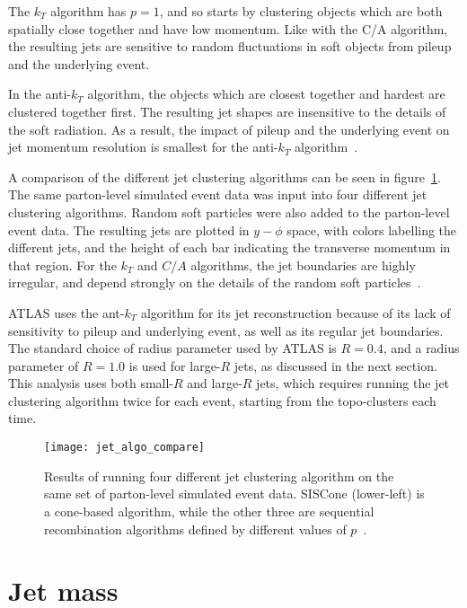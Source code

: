 The $k_T$ algorithm has $p=1$, and so starts by clustering objects which are both spatially close together and have low momentum.
Like with the C/A algorithm, the resulting jets are sensitive to random fluctuations in soft objects from pileup and the underlying event.

In the anti-$k_T$ algorithm, the objects which are closest together and hardest are clustered together first.
The resulting jet shapes are insensitive to the details of the soft radiation.
As a result, the impact of pileup and the underlying event on jet momentum resolution is smallest for the anti-$k_T$ algorithm~\cite{jet-antikt-algo}.

A comparison of the different jet clustering algorithms can be seen in figure~\ref{fig:jet_algo_compare}.
The same parton-level simulated event data was input into four different jet clustering algorithms.
Random soft particles were also added to the parton-level event data.
The resulting jets are plotted in $y-\phi$ space, with colors labelling the different jets, and the height of each bar indicating the transverse momentum in that region.
For the $k_T$ and $C/A$ algorithms, the jet boundaries are highly irregular, and depend strongly on the details of the random soft particles~\cite{jet-antikt-algo}.

ATLAS uses the ant-$k_T$ algorithm for its jet reconstruction because of its lack of sensitivity to pileup and underlying event, as well as its regular jet boundaries.
The standard choice of radius parameter used by ATLAS is $R=0.4$, and a radius parameter of $R=1.0$ is used for large-$R$ jets, as discussed in the next section.
This analysis uses both small-$R$ and large-$R$ jets, which requires running the jet clustering algorithm twice for each event, starting from the topo-clusters each time.

\begin{figure}[!ht]
    \centering
\texttt{[image: jet\_algo\_compare]}
\caption{Results of running four different jet clustering algorithm on the same set of parton-level simulated event data.
SISCone (lower-left) is a cone-based algorithm, while the other three are sequential recombination algorithms defined
by different values of $p$~\cite{jet-antikt-algo}.}
\label{fig:jet_algo_compare}
\end{figure}

\section{Jet mass}\label{sec:jet_mass}

